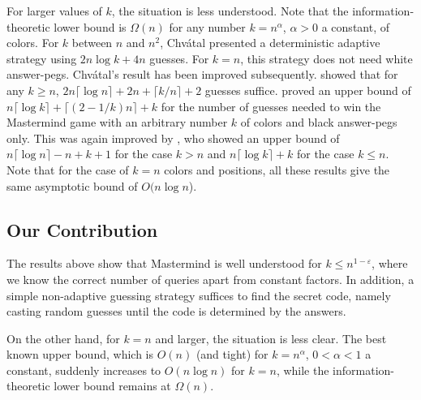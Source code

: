\documentclass[english,a4paper,11pt]{article}
\newcommand{\eps}{{\varepsilon}}
\newcommand{\comment}[1]{{\bf [#1]}}
\newcommand{\RS}[1]{\comment{\textcolor{red}{RS: #1}}}
\newcommand{\ifLongCites}[2]{#1}
\newcommand{\ifLongCites}[2]{#2}
\begin{document}
{For larger values of $k$, the situation is less understood. Note that the information-theoretic lower bound is $\Omega(n)$ for any number $k = n^\alpha$, $\alpha > 0$ a constant, of colors. 
For $k$ between $n$ and $n^2$, Chv\'atal presented a deterministic adaptive strategy using $2n \log k +4n$ guesses. For $k = n$, this strategy does not need white answer-pegs. 
Chv\'atal's result has been improved subsequently. 
\ifLongCites{\cite{Chen96}}{Chen, Cunha, and Homer~\cite{Chen96}} showed that for any $k \geq n$, 
$2n \lceil \log n \rceil+2n+\lceil k/n \rceil+2$ guesses suffice.
\ifLongCites{\cite{Goodrich09}}{Goodrich~\cite{Goodrich09}} proved an upper bound of
$n \lceil \log k \rceil +\lceil(2-1/k)n\rceil+k$ for the number of guesses needed to win the Mastermind game with an arbitrary number $k$ of colors and black answer-pegs only. This was again improved by \ifLongCites{\cite{JaegerP11}}{J\"ager and Peczarski~\cite{JaegerP11}}, who showed an upper bound of $n \lceil \log n \rceil - n + k + 1$ for the case $k > n$ and $n \lceil \log k \rceil + k$ for the case $k \le n$.
Note that for the case of $k = n$ colors and positions, all these results give the same asymptotic bound of $O(n\log n$).


\subsection{Our Contribution}


The results above show that Mastermind is well understood for $k \le n^{1-\eps}$, where we know the correct number of queries apart from constant factors. In addition, a simple non-adaptive guessing strategy suffices to find the secret code, namely casting random guesses until the code is determined by the answers.

On the other hand, for $k = n$ and larger, the situation is less clear. The best known upper bound, which is $O(n)$ (and tight) for $k = n^{\alpha}$, $0<\alpha<1$ a constant, suddenly increases to $O(n \log n)$ for $k = n$, while the information-theoretic lower bound remains at $\Omega(n)$. %

}
\end{document}
